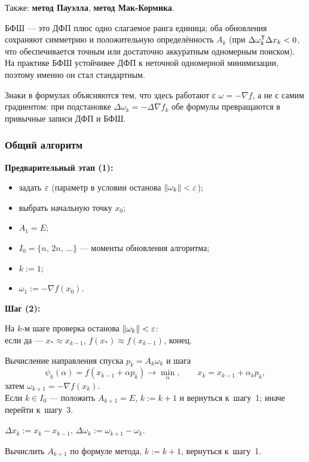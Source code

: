 Также: \textbf{метод Пауэлла}, \textbf{метод Мак-Кормика}.

\begin{idea}
БФШ — это ДФП плюс одно слагаемое ранга единица; оба обновления сохраняют
симметрию и положительную определённость $A_k$ (при
$\Delta\omega_k^{\mathsf{T}} \Delta x_k < 0$, что обеспечивается точным или достаточно
аккуратным одномерным поиском). На практике БФШ устойчивее ДФП к неточной
одномерной минимизации, поэтому именно он стал стандартным.

Знаки в формулах объясняются тем, что здесь работают с $\omega = -\nabla f$,
а не с самим градиентом: при подстановке $\Delta\omega_k = -\Delta \nabla f_k$
обе формулы превращаются в привычные записи ДФП и БФШ.
\end{idea}

\subsubsection*{Общий алгоритм}

\begin{algo}[title={Квазиньютоновский метод}]
\textbf{Предварительный этап (1):}
\begin{itemize}[nosep,left=0pt]
  \item задать $\varepsilon$ (параметр в условии останова $\left\lVert \omega_k \right\rVert < \varepsilon$);
  \item выбрать начальную точку $x_0$;
  \item $A_1 = E$;
  \item $I_0 = \{n,\, 2n,\, \dots\}$ — моменты обновления алгоритма;
  \item $k := 1$;
  \item $\omega_1 := -\nabla f(x_0)$.
\end{itemize}

\medskip
\textbf{Шаг (2):}
\begin{steps}
  \item На $k$-м шаге проверка останова $\left\lVert \omega_k \right\rVert < \varepsilon$:\\
        если да — $x_* \approx x_{k-1}$, $f(x_*) \approx f(x_{k-1})$, конец.
  \item Вычисление направления спуска $p_k = A_k \omega_k$ и шага
        \[
          \psi_k(\alpha) = f(x_{k-1} + \alpha p_k) \to \min_\alpha ,
          \qquad
          x_k = x_{k-1} + \alpha_k p_k ,
        \]
        затем $\omega_{k+1} = -\nabla f(x_k)$.\\
        Если $k \in I_0$ — положить $A_{k+1} = E$, $k := k+1$ и вернуться
        к~шагу~1; иначе перейти к~шагу~3.
  \item $\Delta x_k := x_k - x_{k-1}$, \quad
        $\Delta\omega_k := \omega_{k+1} - \omega_k$.
  \item Вычислить $A_{k+1}$ по формуле метода, $k := k+1$, вернуться к~шагу~1.
\end{steps}
\end{algo}

